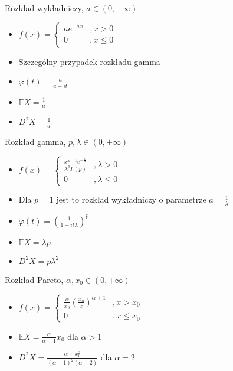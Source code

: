\documentclass[a4paper,12pt]{report}
\theoremstyle{break}
\theoremstyle{definition}
\theoremstyle{defi}
\theoremstyle{break}
\theoremstyle{defi}
\begin{document}
{\Large Rozkład wykładniczy, $ a\in\left(0,+\infty \right) $}
\begin{multicols}{2}
\begin{itemize}
\item $ f(x)=
\left \{
\begin{array}{ll}
ae^{-ax}&,x>0\\
0&,x\le0
\end{array}
\right . $
\item Szczególny przypadek rozkładu gamma
\item $ \varphi(t)=\frac{a}{a-it} $
\item $ \mathbb{E}X=\frac{1}{a} $
\item $ D^2X=\frac{1}{a} $
\end{itemize}
\end{multicols}\newpage
{\Large Rozkład gamma, $ p,\lambda\in\left(0,+\infty \right) $}
\begin{multicols}{2}
\begin{itemize}
\item $ f(x)=
\left \{
\begin{array}{ll}
\frac{x^{p-1}e^{-\frac{x}{\lambda}}}{\lambda^p\Gamma(p)}&,\lambda>0\\
0&,\lambda\le0
\end{array}
\right . $
\item Dla $ p=1 $ jest to rozkład wykładniczy o parametrze $ a=\frac{1}{\lambda} $
\item $ \varphi(t)=\left(\frac{1}{1-it\lambda}\right)^p $
\item $ \mathbb{E}X=\lambda p $
\item $ D^2X=p\lambda^2 $
\end{itemize}
\end{multicols}
{\Large Rozkład Pareto, $ \alpha,x_0\in (0,+\infty ) $}
\begin{multicols}{2}
\begin{itemize}
\item $ f(x)=
\left \{
\begin{array}{ll}
\frac{\alpha}{x_0}\left(\frac{x_0}{x}\right)^{\alpha+1}&,x>x_0\\
0&,x\le x_0
\end{array}
\right . $
\item $ \mathbb{E}X=\frac{\alpha}{\alpha-1}x_0 $ dla $ \alpha>1 $
\item $ D^2X=\frac{\alpha-x_0^2}{(\alpha-1)^2(\alpha-2)} $ dla $ \alpha=2 $
\end{itemize}
\end{multicols}
\end{document}
